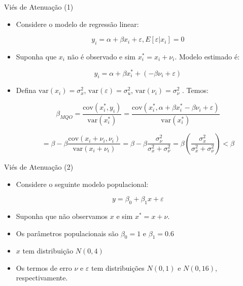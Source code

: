 \documentclass[10pt,slides,xcolor=pdftex,dvipsnames,table]{beamer}
\begin{document}

\begin{frame}{Viés de Atenuação (1)}

\begin{itemize}\itemsep1.2em

\item Considere o modelo de regressão linear:

$$ y_i = \alpha + \beta x_i + \varepsilon, E[ \varepsilon | x_i]=0 $$

\item Suponha que $x_i$ não é observado e sim $x_i^* = x_i + \nu_i$.  Modelo estimado é:  

$$ y_i = \alpha + \beta x_i^* + (-\beta \nu_i + \varepsilon) $$

\item Defina $\text{var} (x_i) = \sigma_x^2$, $\text{var} (\varepsilon) = \sigma_u^2$, $\text{var} (\nu_i) = \sigma_{\nu}^2$ . Temos: 

$$ \beta_{MQO} = \frac{\text{cov} (x_i^*, y_i)}{\text{var} (x_i^*)} = \frac{\text{cov} (x_i^*, \alpha + \beta x_i^* - \beta \nu_i + \varepsilon)}{\text{var} (x_i^*)} $$

$$ = \beta - \beta \frac{\text{cov} (x_i+\nu_i, \nu_i) }{\text{var} (x_i + \nu_i)} = \beta - \beta \frac{\sigma_{\nu}^2}{\sigma_x^2 + \sigma_{\nu}^2} = \beta \left( \frac{\sigma_x^2}{\sigma_x^2 + \sigma_{\nu}^2} \right) < \beta $$
        
\end{itemize}

\end{frame}


\begin{frame}{Viés de Atenuação (2)}

\begin{itemize}\itemsep1.2em

\item Considere o seguinte modelo populacional:

$$ y = \beta_0 + \beta_1 x + \varepsilon $$

\item Suponha que não observamos $x$ e sim $x^* = x + \nu$.

\item Os parâmetros populacionais são $\beta_0 = 1$ e $\beta_1 = 0.6$ 

\item $x$ tem distribuição $N(0,4)$

\item Os termos de erro $\nu$ e $\varepsilon$ tem distribuições $N(0,1)$ e $N(0,16)$, respectivamente. 

\end{itemize}

\end{frame}
\end{document}
